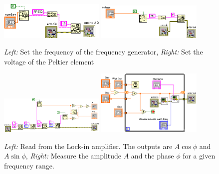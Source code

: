 \begin{figure}[h]
	\centering
	\includegraphics[width=0.45\textwidth]{figures/SetOneFreqencyd.png}
	\includegraphics[width=0.45\textwidth]{figures/SetVoltaged.png}
	\caption{\emph{Left:} Set the frequency of the frequency generator, \emph{Right:} Set the voltage of the Peltier element}
	\label{fig9}
\end{figure}

\begin{figure}[h]
	\centering
	\includegraphics[width=0.45\textwidth]{figures/ReadLockInd.png}
	\includegraphics[width=0.45\textwidth]{figures/SetFreqRund.png}
	\caption{\emph{Left:} Read from the Lock-in amplifier. The outputs are $A\cos \phi$ and $A \sin \phi$, \emph{Right:} Measure the amplitude $A$ and the phase $\phi$ for a given frequency range.}
	\label{fig10}
\end{figure}


